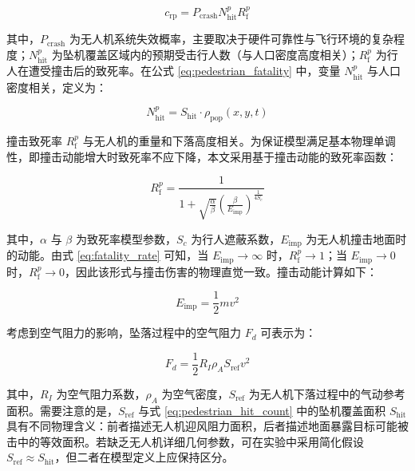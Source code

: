 \begin{equation}
c_{\mathrm{rp}} = P_{\mathrm{crash}} N_{\mathrm{hit}}^p R_{\mathrm{f}}^p
\label{eq:pedestrian_fatality}
\end{equation}

其中，$P_{\mathrm{crash}}$ 为无人机系统失效概率，主要取决于硬件可靠性与飞行环境的复杂程度；$N_{\mathrm{hit}}^p$ 为坠机覆盖区域内的预期受击行人数（与人口密度高度相关）；$R_{\mathrm{f}}^p$ 为行人在遭受撞击后的致死率。在公式 \eqref{eq:pedestrian_fatality} 中，变量 $N_{\mathrm{hit}}^p$ 与人口密度相关，定义为：

\begin{equation}
N_{\mathrm{hit}}^p = S_{\mathrm{hit}} \cdot \rho_{\mathrm{pop}}(x,y,t)
\label{eq:pedestrian_hit_count}
\end{equation}

撞击致死率 $R_{\mathrm{f}}^p$ 与无人机的重量和下落高度相关。为保证模型满足基本物理单调性，即撞击动能增大时致死率不应下降，本文采用基于撞击动能的致死率函数：

\begin{equation}
R_{\mathrm{f}}^p =
\frac{1}{1 + \sqrt{\frac{\alpha}{\beta}}
\left(\frac{\beta}{E_{\mathrm{imp}}}\right)^{\frac{1}{4S_c}}}
\label{eq:fatality_rate}
\end{equation}

其中，$\alpha$ 与 $\beta$ 为致死率模型参数，$S_c$ 为行人遮蔽系数，$E_{\mathrm{imp}}$ 为无人机撞击地面时的动能。由式 \eqref{eq:fatality_rate} 可知，当 $E_{\mathrm{imp}}\rightarrow\infty$ 时，$R_{\mathrm{f}}^p\rightarrow1$；当 $E_{\mathrm{imp}}\rightarrow0$ 时，$R_{\mathrm{f}}^p\rightarrow0$，因此该形式与撞击伤害的物理直觉一致。撞击动能计算如下：

\begin{equation}
E_{\mathrm{imp}} = \frac{1}{2} m v^2
\label{eq:impact_energy}
\end{equation}

考虑到空气阻力的影响，坠落过程中的空气阻力 $F_d$ 可表示为：

\begin{equation}
F_d = \frac{1}{2} R_I \rho_A S_{\mathrm{ref}} v^2
\label{eq:drag_force}
\end{equation}

其中，$R_I$ 为空气阻力系数，$\rho_A$ 为空气密度，$S_{\mathrm{ref}}$ 为无人机下落过程中的气动参考面积。需要注意的是，$S_{\mathrm{ref}}$ 与式 \eqref{eq:pedestrian_hit_count} 中的坠机覆盖面积 $S_{\mathrm{hit}}$ 具有不同物理含义：前者描述无人机迎风阻力面积，后者描述地面暴露目标可能被击中的等效面积。若缺乏无人机详细几何参数，可在实验中采用简化假设 $S_{\mathrm{ref}}\approx S_{\mathrm{hit}}$，但二者在模型定义上应保持区分。

